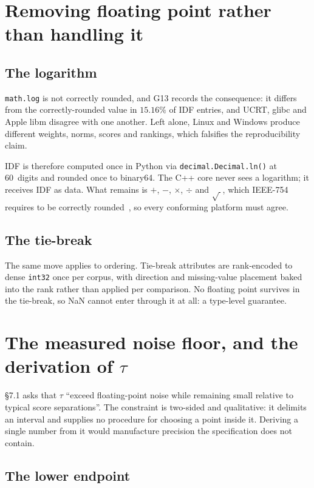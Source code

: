 \documentclass[11pt,a4paper]{article}
\theoremstyle{plain} \newtheorem{proposition}{Proposition} \theoremstyle{remark}
\newcommand{\addendum}[1]{\textsf{G#1}}
\newcommand{\code}[1]{\texttt{\small #1}}
\begin{document}
\section{Removing floating point rather than handling it}

\subsection{The logarithm}\label{sec:log}

\code{math.log} is not correctly rounded, and \addendum{13} records the
consequence: it differs from the correctly-rounded value in $15.16\%$ of IDF
entries, and UCRT, glibc and Apple libm disagree with one another. Left alone,
Linux and Windows produce different weights, norms, scores and rankings, which
falsifies the reproducibility claim.

IDF is therefore computed once in Python via \code{decimal.Decimal.ln()} at
60~digits and rounded once to binary64. The C++ core never sees a logarithm; it
receives IDF as data. What remains is $+$, $-$, $\times$, $\div$ and $\sqrt{\
}$, which IEEE-754 requires to be correctly rounded~\cite{ieee754-2019}, so
every conforming platform must agree.

\subsection{The tie-break}

The same move applies to ordering. Tie-break attributes are rank-encoded to
dense \code{int32} once per corpus, with direction and missing-value placement
baked into the rank rather than applied per comparison. No floating point
survives in the tie-break, so NaN cannot enter through it at all: a type-level
guarantee.

\section{The measured noise floor, and the derivation of \texorpdfstring{$\tau$}{tau}}

\S7.1 asks that $\tau$ ``exceed floating-point noise while remaining small
relative to typical score separations''. The constraint is two-sided and
qualitative: it delimits an interval and supplies no procedure for choosing a
point inside it. Deriving a single number from it would manufacture precision
the specification does not contain.

\subsection{The lower endpoint}
\end{document}
